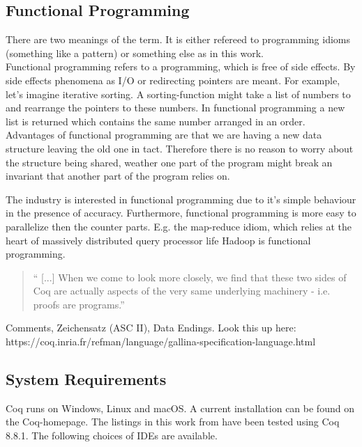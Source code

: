 \subsection{Functional Programming}
There are two meanings of the term. 
It is either refereed to programming idioms (something like a pattern) or something else as in this work.\\

Functional programming refers to a programming, which is free of side effects.
By side effects phenomena as I/O or redirecting pointers are meant. 
For example, let's imagine iterative sorting. 
A sorting-function might take a list of numbers to and rearrange the pointers to these numbers.
In functional programming a new list is returned which contains the same number arranged in an order.\\ 
Advantages of functional programming are  that we are having a new data structure leaving the old one in tact. 
Therefore there is no reason to worry about the structure being shared, weather one part of the program might break an invariant that another part of the program relies on.\par
The industry is interested in functional programming due to it's simple behaviour in the presence of accuracy.
Furthermore, functional programming is more easy to parallelize then the counter parts.
E.g. the map-reduce idiom, which relies at the heart of massively distributed query processor life \gls{Hadoop} is functional programming. 

\begin{quote}
`` [...] When we come to look more closely, we find that these two sides of Coq are actually aspects of the very same underlying machinery - i.e. proofs are programs.'' 
\end{quote}



Comments, Zeichensatz (ASC II), Data Endings.
Look this up here:\\
https://coq.inria.fr/refman/language/gallina-specification-language.html




\subsection{System Requirements}

Coq runs on Windows, Linux and macOS.
A current installation can be found on the Coq-homepage. 
The listings in this work from \cite{PACGGHSY} have been tested using Coq 8.8.1.
The following choices of IDEs are available. 

